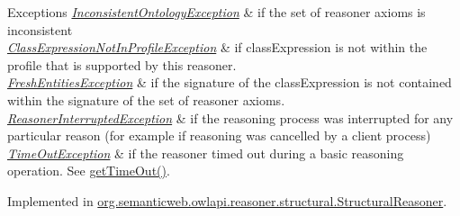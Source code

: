 \begin{DoxyExceptions}{Exceptions}
{\em \hyperlink{classorg_1_1semanticweb_1_1owlapi_1_1reasoner_1_1_inconsistent_ontology_exception}{Inconsistent\-Ontology\-Exception}} & if the set of reasoner axioms is inconsistent \\
\hline
{\em \hyperlink{classorg_1_1semanticweb_1_1owlapi_1_1reasoner_1_1_class_expression_not_in_profile_exception}{Class\-Expression\-Not\-In\-Profile\-Exception}} & if {\ttfamily class\-Expression} is not within the profile that is supported by this reasoner. \\
\hline
{\em \hyperlink{classorg_1_1semanticweb_1_1owlapi_1_1reasoner_1_1_fresh_entities_exception}{Fresh\-Entities\-Exception}} & if the signature of the class\-Expression is not contained within the signature of the set of reasoner axioms. \\
\hline
{\em \hyperlink{classorg_1_1semanticweb_1_1owlapi_1_1reasoner_1_1_reasoner_interrupted_exception}{Reasoner\-Interrupted\-Exception}} & if the reasoning process was interrupted for any particular reason (for example if reasoning was cancelled by a client process) \\
\hline
{\em \hyperlink{classorg_1_1semanticweb_1_1owlapi_1_1reasoner_1_1_time_out_exception}{Time\-Out\-Exception}} & if the reasoner timed out during a basic reasoning operation. See \hyperlink{interfaceorg_1_1semanticweb_1_1owlapi_1_1reasoner_1_1_o_w_l_reasoner_a44b2c968f989afe5290db29c90faa164}{get\-Time\-Out()}. \\
\hline
\end{DoxyExceptions}


Implemented in \hyperlink{classorg_1_1semanticweb_1_1owlapi_1_1reasoner_1_1structural_1_1_structural_reasoner_a403565edebc10cde887b5ae6b527e31b}{org.\-semanticweb.\-owlapi.\-reasoner.\-structural.\-Structural\-Reasoner}.

